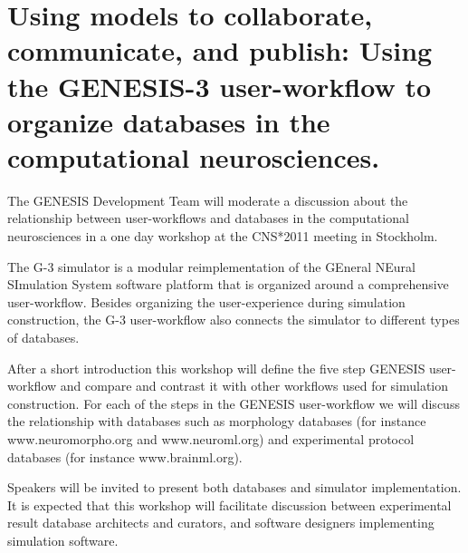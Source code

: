 \documentclass[12pt]{article}
\begin{document}


\section*{Using models to collaborate, communicate, and publish:  Using the GENESIS-3 user-workflow to organize databases in the computational neurosciences.}

The GENESIS Development Team will moderate a discussion about the
relationship between user-workflows and databases in the computational
neurosciences in a one day workshop at the CNS*2011 meeting in
Stockholm.

\vspace{3mm}

The G-3 simulator is a modular reimplementation of the GEneral NEural
SImulation System software platform that is organized around a
comprehensive user-workflow.  Besides organizing the user-experience
during simulation construction, the G-3 user-workflow also connects
the simulator to different types of databases.

After a short introduction this workshop will define the five step
GENESIS user-workflow and compare and contrast it with other workflows
used for simulation construction.  For each of the steps in the
GENESIS user-workflow we will discuss the relationship with
databases such as morphology databases (for instance
www.neuromorpho.org and www.neuroml.org) and experimental protocol
databases (for instance www.brainml.org).

Speakers will be invited to present both databases and simulator
implementation.  It is expected that this workshop will facilitate
discussion between experimental result database architects and
curators, and software designers implementing simulation software.





\end{document}
